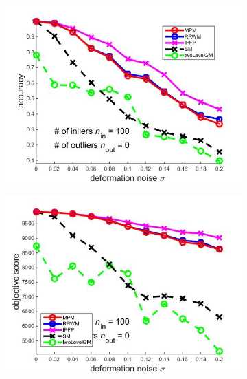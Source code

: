 \documentclass[
	fontsize=12pt,
	paper=a4,
	twoside=false,
	numbers=noenddot,
	plainheadsepline,
	toc=listof,
	toc=bibliography
]{scrartcl}
\begin{document}
\begin{figure}[ht] 
	\begin{subfigure}[b]{0.3\textwidth}
		\centering
		\includegraphics[scale=0.25]{"fig_ver2108/syntheticPointSets/deformation_test/accuracy_avg10tests"} 
	\end{subfigure}%
	\begin{subfigure}[b]{0.3\textwidth}
		\centering
		\includegraphics[scale=0.25]{"fig_ver2108/syntheticPointSets/deformation_test/score_avg10tests"} 
	\end{subfigure} 
	\begin{subfigure}[b]{0.3\textwidth}
		\centering

\end{subfigure}
\end{figure}
\end{document}
